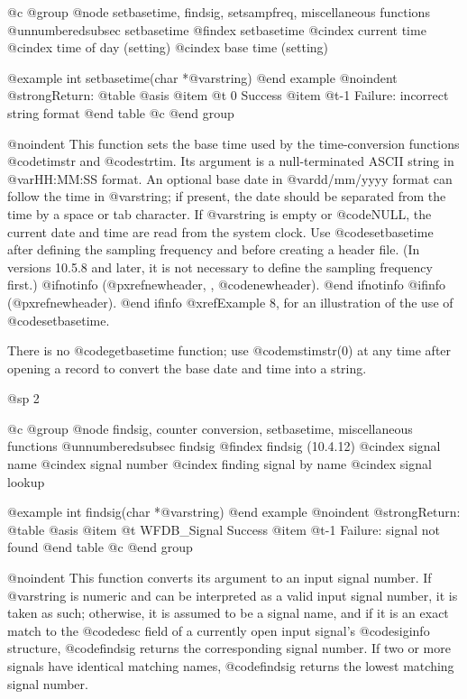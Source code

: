 {{{{{{{{@c @group
@node     setbasetime, findsig, setsampfreq, miscellaneous functions
@unnumberedsubsec setbasetime
@findex setbasetime
@cindex current time
@cindex time of day (setting)
@cindex base time (setting)

@example
int setbasetime(char *@var{string})
@end example
@noindent
@strong{Return:}
@table @asis
@item @t{ 0}
Success
@item @t{-1}
Failure: incorrect string format
@end table
@c @end group

@noindent
This function sets the base time used by the time-conversion functions
@code{timstr} and @code{strtim}.  Its argument is a null-terminated
ASCII string in @var{HH:MM:SS} format.  An optional base date in
@var{dd/mm/yyyy} format can follow the time in @var{string}; if present,
the date should be separated from the time by a space or tab character.  If
@var{string} is empty or @code{NULL}, the current date and time are read
from the system clock.  Use @code{setbasetime} after defining the sampling
frequency and before creating a header file.  (In versions 10.5.8 and later,
it is not necessary to define the sampling frequency first.)
@ifnotinfo
(@pxref{newheader, , @code{newheader}}).
@end ifnotinfo
@ifinfo
(@pxref{newheader}).
@end ifinfo
@xref{Example 8}, for an illustration of the use of @code{setbasetime}.

There is no @code{getbasetime} function;  use @code{mstimstr(0)} at any
time after opening a record to convert the base date and time into a string.

@sp 2

@c @group
@node     findsig, counter conversion, setbasetime, miscellaneous functions
@unnumberedsubsec findsig
@findex findsig (10.4.12)
@cindex signal name
@cindex signal number
@cindex finding signal by name
@cindex signal lookup

@example
int findsig(char *@var{string})
@end example
@noindent
@strong{Return:}
@table @asis
@item @t{ WFDB_Signal}
Success
@item @t{-1}
Failure: signal not found
@end table
@c @end group

@noindent
This function converts its argument to an input signal number.
If @var{string} is numeric and can be interpreted as a valid
input signal number, it is taken as such;  otherwise, it is
assumed to be a signal name, and if it is an exact match to the
@code{desc} field of a currently open input signal's @code{siginfo}
structure, @code{findsig} returns the corresponding signal number.
If two or more signals have identical matching names, @code{findsig}
returns the lowest matching signal number.


}}}}}}}}
